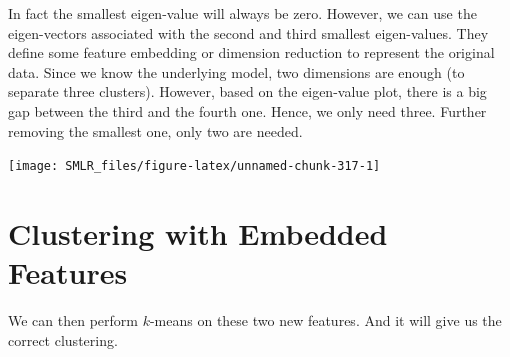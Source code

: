 \documentclass[
]{book}
\newenvironment{Shaded}{\begin{snugshade}}{\end{snugshade}}
\newcommand{\AttributeTok}[1]{\textcolor[rgb]{0.13,0.29,0.53}{#1}}
\newcommand{\DecValTok}[1]{\textcolor[rgb]{0.00,0.00,0.81}{#1}}
\newcommand{\FloatTok}[1]{\textcolor[rgb]{0.00,0.00,0.81}{#1}}
\newcommand{\FunctionTok}[1]{\textcolor[rgb]{0.13,0.29,0.53}{\textbf{#1}}}
\newcommand{\NormalTok}[1]{#1}
\newcommand{\SpecialCharTok}[1]{\textcolor[rgb]{0.81,0.36,0.00}{\textbf{#1}}}
\newcommand{\StringTok}[1]{\textcolor[rgb]{0.31,0.60,0.02}{#1}}
\theoremstyle{definition}
\theoremstyle{definition}
\theoremstyle{definition}
\theoremstyle{definition}
\theoremstyle{remark}
\begin{document}
In fact the smallest eigen-value will always be zero. However, we can use the eigen-vectors associated with the second and third smallest eigen-values. They define some feature embedding or dimension reduction to represent the original data. Since we know the underlying model, two dimensions are enough (to separate three clusters). However, based on the eigen-value plot, there is a big gap between the third and the fourth one. Hence, we only need three. Further removing the smallest one, only two are needed.

\begin{Shaded}
\end{Shaded}

\begin{center}\texttt{[image: SMLR\_files/figure-latex/unnamed-chunk-317-1]} \end{center}

\hypertarget{clustering-with-embedded-features}{%
\section{Clustering with Embedded Features}\label{clustering-with-embedded-features}}

We can then perform \(k\)-means on these two new features. And it will give us the correct clustering.
\end{document}
